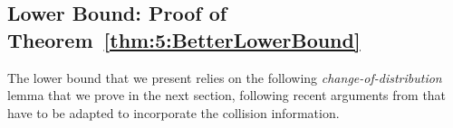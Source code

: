 

\subsection{Lower Bound: Proof of Theorem~\ref{thm:5:BetterLowerBound}}
\label{proof:5:BetterLowerBound}

The lower bound that we present relies on the following \emph{change-of-distribution} lemma that we prove in the next section, following recent arguments from \cite{Garivier16TrueShape} that have to be adapted to incorporate the collision information.


